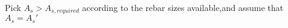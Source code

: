 Pick $A_s > A_{s,required}$ according to the rebar sizes available,and assume
that $A_{s} = A_{s}'$
